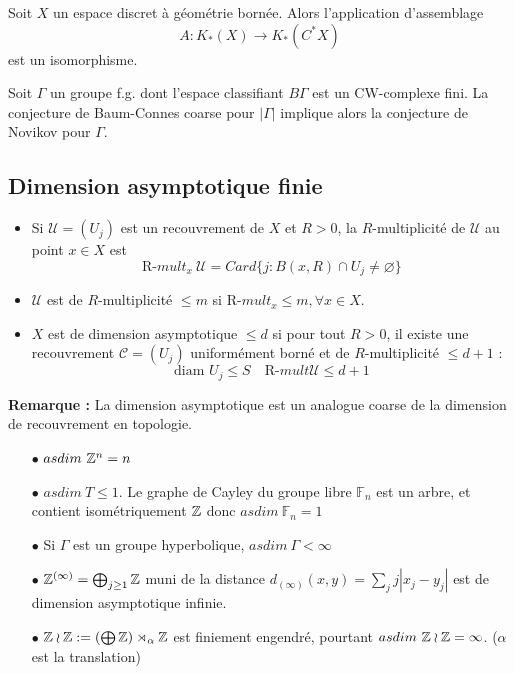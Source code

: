 \documentclass{beamer}
\begin{document}
\begin{frame}
\begin{conj} Soit $X$ un espace discret à géométrie bornée. Alors l'application d'assemblage 
\[A : K_*(X)\rightarrow K_*(C^*X)\]
est un isomorphisme.
\end{conj}
\begin{thm} Soit $\Gamma$ un groupe f.g. dont l'espace classifiant $B\Gamma$ est un CW-complexe fini. La conjecture de Baum-Connes coarse pour $|\Gamma|$ implique alors la conjecture de Novikov pour $\Gamma$. 
\end{thm}
\end{frame}

\subsection{Dimension asymptotique finie}
\begin{frame}
\tableofcontents[currentsubsection]
\end{frame}

\begin{frame}
\begin{definition}
\begin{itemize}
\item Si $\mathcal U=(U_j)$ est un recouvrement de $X$ et $R>0$, la $R$-multiplicité de $\mathcal U$ au point $x\in X$ est
\[\text{R-}mult_x\ \mathcal U=Card\{j : B(x,R)\cap U_j \neq \varnothing\}\]
\item $\mathcal U $ est de $R$-multiplicité $\leq m$ si $\text{R-}mult_x\leq m,\forall x\in X$.
\item $X$ est de dimension asymptotique $\leq d$ si pour tout $R>0$, il existe une recouvrement $\mathcal C=(U_j)$ uniformément borné et de $R$-multiplicité $\leq d+1$ :
\[\text{diam }U_j \leq S\quad \text{R-}mult \mathcal U \leq d+1\]
\end{itemize}
\end{definition}
\textbf{Remarque :} La dimension asymptotique est un analogue coarse de la dimension de recouvrement en topologie.\\

\end{frame}

\begin{frame}
\begin{itemize}
\item[$\bullet$] $asdim\ \mathbb Z^n=n$
\item[$\bullet$] $asdim\ T \leq 1$. Le graphe de Cayley du groupe libre $\mathbb F_n$ est un arbre, et contient isométriquement $\mathbb Z$ donc $asdim\ \mathbb F_n= 1$ 
\item[$\bullet$] Si $\Gamma$ est un groupe hyperbolique, $asdim \ \Gamma <\infty$
\item[$\bullet$] $\mathbb Z^{(\infty)}=\bigoplus_{j\geq 1} \mathbb Z$ muni de la distance $d_{(\infty)}(x,y)=\sum_j j|x_j-y_j|$ est de dimension asymptotique infinie. 
\item[$\bullet$] $\mathbb Z \wr \mathbb Z :=(\bigoplus\mathbb Z)\rtimes_\alpha \mathbb Z$ est finiement engendré, pourtant $asdim\ \mathbb Z\wr \mathbb Z =\infty$. ($\alpha$ est la translation)
\end{itemize}
\end{frame}
\end{document}
